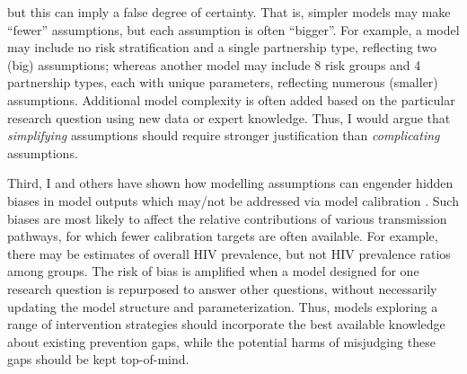 but this can imply a false degree of certainty.
That is, simpler models may make ``fewer'' assumptions, but each assumption is often ``bigger''.
For example, a model may include no risk stratification and a single partnership type,
reflecting two (big) assumptions; whereas
another model may include 8 risk groups and 4 partnership types, each with unique parameters,
reflecting numerous (smaller) assumptions.
Additional model complexity is often added based on the particular research question
using new data or expert knowledge.
Thus, I would argue that \emph{simplifying} assumptions
should require stronger justification than \emph{complicating} assumptions.
\par
Third, I and others have shown how modelling assumptions can engender
hidden biases in model outputs which may/not be addressed via model calibration
\cite{Hontelez2013,Johnson2016mf,Bernard2017,Knight2020}.
Such biases are most likely to affect
the relative contributions of various transmission pathways,
for which fewer calibration targets are often available.
For example, there may be estimates of overall HIV prevalence,
but not HIV prevalence ratios among groups.
The risk of bias is amplified when a model designed for one research question
is repurposed to answer other questions,
without necessarily updating the model structure and parameterization.
Thus, models exploring a range of intervention strategies
should incorporate the best available knowledge about existing prevention gaps,
while the potential harms of misjudging these gaps should be kept top-of-mind.
